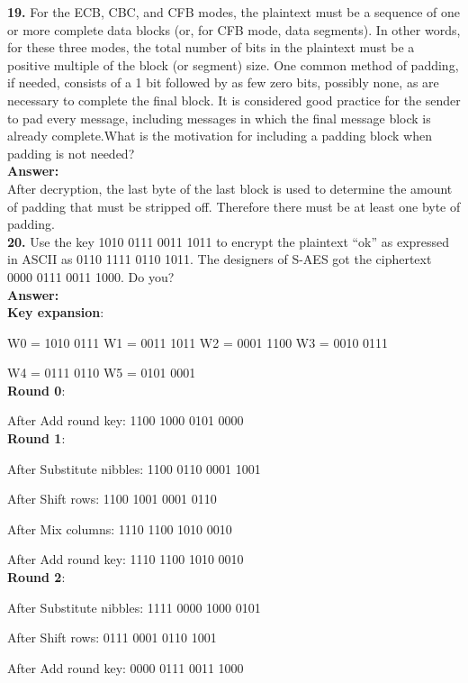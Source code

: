 \documentclass[paper=a4, fontsize=11pt]{scrartcl} %
\numberwithin{equation}{section} %
\numberwithin{figure}{section} %
\numberwithin{table}{section} %
\begin{document}
\textbf{19.} For the ECB, CBC, and CFB modes, the plaintext must be a sequence of one or more complete data blocks (or, for CFB mode, data segments). In other words, for these three modes, the total number of bits in the plaintext must be a positive multiple of the block (or segment) size. One common method of padding, if needed, consists of a 1 bit followed by as few zero bits, possibly none, as are necessary to complete the final block. It is considered good practice for the sender to pad every message, including messages in which the final message block is already complete.What is the motivation for including a padding block when padding is not needed?\\


\textbf{Answer:}\\

After decryption, the last byte of the last block is used to determine the amount of padding that must be stripped off. Therefore there must be at least one byte of padding.\\

\textbf{20.} Use the key 1010 0111 0011 1011 to encrypt the plaintext “ok” as expressed in ASCII as 0110 1111 0110 1011. The designers of S-AES got the ciphertext 0000 0111 0011 1000. Do you?\\

\textbf{Answer:}\\

\textbf{Key expansion}:
\par\setlength\parindent{1em} W0 = 1010 0111 W1 = 0011 1011 W2 = 0001 1100 W3 = 0010 0111
\par\setlength\parindent{1em}W4 = 0111 0110 W5 = 0101 0001\\
\textbf{Round 0}:
\par\setlength\parindent{1em}After Add round key: 1100 1000 0101 0000\\
\textbf{Round 1}:
\par\setlength\parindent{1em}After Substitute nibbles: 1100 0110 0001 1001
\par\setlength\parindent{1em}After Shift rows: 1100 1001 0001 0110
\par\setlength\parindent{1em}After Mix columns: 1110 1100 1010 0010
\par\setlength\parindent{1em}After Add round key: 1110 1100 1010 0010\\
\textbf{Round 2}:
\par\setlength\parindent{1em}After Substitute nibbles: 1111 0000 1000 0101
\par\setlength\parindent{1em}After Shift rows: 0111 0001 0110 1001
\par\setlength\parindent{1em}After Add round key: 0000 0111 0011 1000\\
\end{document}
